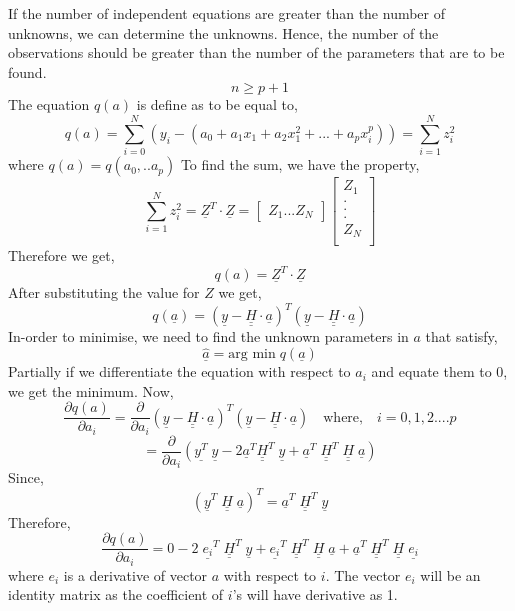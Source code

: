 \noindent If the number of independent equations are greater than the number of unknowns, we can determine the unknowns. Hence, the number of the observations should be greater than the number of the parameters that are to be found.
$$n \geq p+1$$
\noindent The equation $q(a)$ is define as to be equal to,
$$ q(a) = \sum_{i=0}^N(y_i - (a_0 + a_1x_1 + a_2x_1^2 + ...+a_px_i^p))=\sum_{i=1}^Nz_i^2 $$
\noindent where $  q(a) = q(a_0,..a_p) $
\noindent To find the sum, we have the property,
$$ \sum_{i=1}^Nz_i^2 = \underline{Z}^T \cdot \underline{Z} = \begin{bmatrix}
Z_1
.
.
.
Z_N
\end{bmatrix}   \begin{bmatrix}
Z_1\\
.\\
.\\
.\\
Z_N\\
\end{bmatrix}     $$
\noindent Therefore we get,
$$  q(a) = \underline{Z}^T \cdot \underline{Z}   $$
\noindent After substituting the value for $Z$ we get,
$$q(\underline{a}) = (\underline{y} - \underline{\underline{H}}\cdot \underline{a})^T(\underline{y} - \underline{\underline{H}}\cdot \underline{a})$$
\noindent In-order to minimise, we need to find the unknown parameters in $a$ that satisfy,
$$ \underline{\hat{a}} = \text{arg min}\; q(\underline{a})$$
\noindent Partially if we differentiate the equation with respect to $a_i$ and equate them to 0, we get the minimum. Now,
$$\frac{\partial q(a)}{\partial a_i} = \frac{ \partial}{ \partial a_i}(\underline{y} - \underline{\underline{H}} \cdot \underline{a})^T(\underline{y} - \underline{\underline{H}} \cdot \underline{a}) \quad \text{where,} \quad i=0,1,2....p$$
$$ = \frac{\partial}{\partial a_i}(\underline{y^T}\; \underline{y} - 2\underline{a}^{T}\underline{\underline{H}}^T\;\underline{y} + \underline{a}^T\;\underline{\underline{H}}^T\; \underline{\underline{H}}\;\underline{a})$$
\noindent Since,
$$(\underline{y}^T \; \underline{\underline{H}}\; \underline{a})^T = \underline{a}^T \; \underline{\underline{H}}^T\; \underline{y}$$
\noindent Therefore,
$$\frac{\partial q(a)}{\partial a_i} = 0 - 2 \; \underline{e_i}^T\; \underline{\underline{H}}^T \; \underline{y}+ \underline{e_i}^{T} \;\underline{\underline{H}}^T\;\underline{\underline{H}}\; \underline{a} + \underline{a}^T\;\underline{\underline{H}}^T\; \underline{\underline{H}}\;\underline{e_i} $$
\noindent where $e_i$ is a derivative of vector $a$ with respect to $i.$ The vector $e_i$ will be an identity matrix as the coefficient of $i$'s will have derivative as 1.
